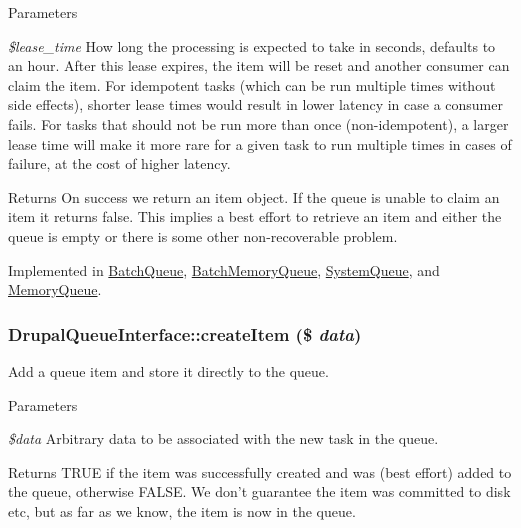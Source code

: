 \begin{DoxyParams}{Parameters}
\item[{\em \$lease\_\-time}]How long the processing is expected to take in seconds, defaults to an hour. After this lease expires, the item will be reset and another consumer can claim the item. For idempotent tasks (which can be run multiple times without side effects), shorter lease times would result in lower latency in case a consumer fails. For tasks that should not be run more than once (non-\/idempotent), a larger lease time will make it more rare for a given task to run multiple times in cases of failure, at the cost of higher latency. \end{DoxyParams}
\begin{DoxyReturn}{Returns}
On success we return an item object. If the queue is unable to claim an item it returns false. This implies a best effort to retrieve an item and either the queue is empty or there is some other non-\/recoverable problem. 
\end{DoxyReturn}


Implemented in \hyperlink{classBatchQueue_a489fb34e9fe09e9434d81a3fba605d97}{BatchQueue}, \hyperlink{classBatchMemoryQueue_aca687797fff1fee4a86293e8c32190ad}{BatchMemoryQueue}, \hyperlink{classSystemQueue_aa5f774d4ef4b31f1318751d9b9872071}{SystemQueue}, and \hyperlink{classMemoryQueue_a24cba156a854a7b4b6c81c3d2614508d}{MemoryQueue}.\hypertarget{interfaceDrupalQueueInterface_a1bdef6341808aaf8b3de821b7b71f137}{
\subsubsection[{createItem}]{\setlength{\rightskip}{0pt plus 5cm}DrupalQueueInterface::createItem (\$ {\em data})}}
\label{interfaceDrupalQueueInterface_a1bdef6341808aaf8b3de821b7b71f137}
Add a queue item and store it directly to the queue.


\begin{DoxyParams}{Parameters}
\item[{\em \$data}]Arbitrary data to be associated with the new task in the queue. \end{DoxyParams}
\begin{DoxyReturn}{Returns}
TRUE if the item was successfully created and was (best effort) added to the queue, otherwise FALSE. We don't guarantee the item was committed to disk etc, but as far as we know, the item is now in the queue. 
\end{DoxyReturn}



